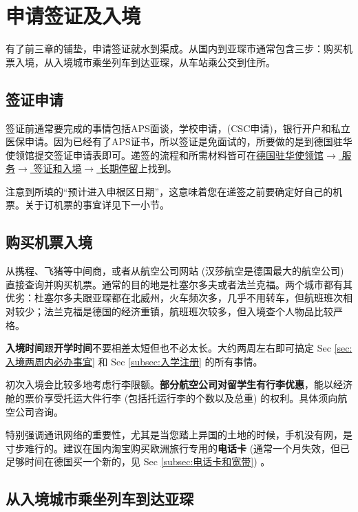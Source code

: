 \section{申请签证及入境}\label{sec:申请签证及入境}

  有了前三章的铺垫，申请签证就水到渠成。从国内到亚琛市通常包含三步：购买机票入境，从入境城市乘坐列车到达亚琛，从车站乘公交到住所。

  \subsection{签证申请}\label{subsec:签证申请}

    签证前通常要完成的事情包括APS面谈，学校申请，(CSC申请)，银行开户和私立医保申请。因为已经有了APS证书，所以签证是免面试的，所要做的是到德国驻华使领馆提交签证申请表即可。递签的流程和所需材料皆可在\href{https://china.diplo.de/cn-zh/service/visa-einreise/nationales-visum/1345434?openAccordionId=item-1345454-4-panel}{德国驻华使领馆$\rightarrow$ 服务$\rightarrow$ 签证和入境$\rightarrow$ 长期停留}上找到。

    注意到所填的``预计进入申根区日期''，这意味着您在递签之前要确定好自己的机票。关于订机票的事宜详见下一小节。

  \subsection{购买机票入境}\label{subsec:购买机票入境}

    从携程、飞猪等中间商，或者从航空公司网站 (汉莎航空是德国最大的航空公司) 直接查询并购买机票。通常的目的地是杜塞尔多夫或者法兰克福。两个城市都有其优劣：杜塞尔多夫跟亚琛都在北威州，火车频次多，几乎不用转车，但航班班次相对较少；法兰克福是德国的经济重镇，航班班次较多，但入境查个人物品比较严格。

    \textbf{入境时间}跟\textbf{开学时间}不要相差太短但也不必太长。大约两周左右即可搞定 Sec \ref{sec:入境两周内必办事宜} 和 Sec \ref{subsec:入学注册} 的所有事情。

    初次入境会比较多地考虑行李限额。\textbf{部分航空公司对留学生有行李优惠}，能以经济舱的票价享受托运大件行李 (包括托运行李的个数以及总重) 的权利。具体须向航空公司咨询。

    特别强调通讯网络的重要性，尤其是当您踏上异国的土地的时候，手机没有网，是寸步难行的。建议在国内淘宝购买欧洲旅行专用的\textbf{电话卡} (通常一个月失效，但已足够时间在德国买一个新的，见 Sec \ref{subsec:电话卡和宽带}) 。

  \subsection{从入境城市乘坐列车到达亚琛}\label{subsec:从入境城市乘坐列车到达亚琛}

